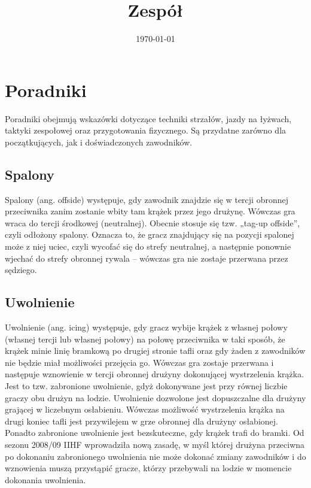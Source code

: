\documentclass{article}
\title{Zespół}
\date{\today}
\begin{document}
\maketitle

\section{Poradniki}

Poradniki obejmują wskazówki dotyczące techniki strzałów, jazdy na łyżwach, taktyki zespołowej oraz przygotowania fizycznego. Są przydatne zarówno dla początkujących, jak i doświadczonych zawodników.

\subsection{Spalony}

Spalony (ang. offside) występuje, gdy zawodnik znajdzie się w tercji obronnej przeciwnika zanim zostanie wbity tam krążek przez jego drużynę. Wówczas gra wraca do tercji środkowej (neutralnej). Obecnie stosuje się tzw. „tag-up offside”, czyli odłożony spalony. Oznacza to, że gracz znajdujący się na pozycji spalonej może z niej uciec, czyli wycofać się do strefy neutralnej, a następnie ponownie wjechać do strefy obronnej rywala – wówczas gra nie zostaje przerwana przez sędziego.

\subsection{Uwolnienie}

Uwolnienie (ang. icing) występuje, gdy gracz wybije krążek z własnej połowy (własnej tercji lub własnej połowy) na połowę przeciwnika w taki sposób, że krążek minie linię bramkową po drugiej stronie tafli oraz gdy żaden z zawodników nie będzie miał możliwości przejęcia go. Wówczas gra zostaje przerwana i następuje wznowienie w tercji obronnej drużyny dokonującej wystrzelenia krążka. Jest to tzw. zabronione uwolnienie, gdyż dokonywane jest przy równej liczbie graczy obu drużyn na lodzie. Uwolnienie dozwolone jest dopuszczalne dla drużyny grającej w liczebnym osłabieniu. Wówczas możliwość wystrzelenia krążka na drugi koniec tafli jest przywilejem w grze obronnej dla drużyny osłabionej. Ponadto zabronione uwolnienie jest bezskuteczne, gdy krążek trafi do bramki. Od sezonu 2008/09 IIHF wprowadziła nową zasadę, w myśl której drużyna przeciwna po dokonaniu zabronionego uwolnienia nie może dokonać zmiany zawodników i do wznowienia muszą przystąpić gracze, którzy przebywali na lodzie w momencie dokonania uwolnienia.
\end{document}
